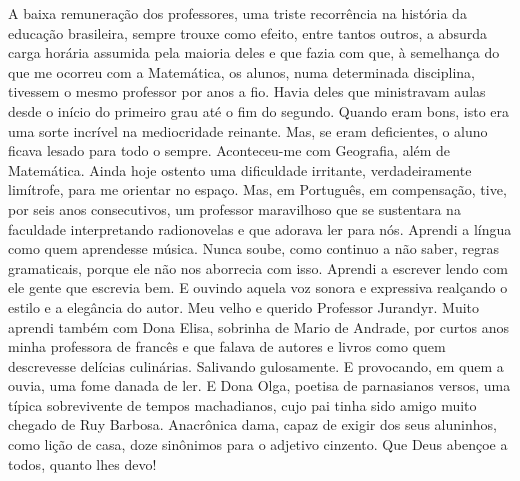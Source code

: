 A baixa remuneração dos professores, uma triste recorrência na história da educação brasileira, sempre trouxe como efeito, entre tantos outros, a absurda carga horária assumida pela maioria deles e que fazia com que, à semelhança do que me ocorreu com a Matemática, os alunos, numa determinada disciplina, tivessem o mesmo professor por anos a fio. 
Havia deles que ministravam aulas desde o início do primeiro grau até o fim do segundo. 
Quando eram bons, isto era uma sorte incrível na mediocridade reinante. 
Mas, se eram deficientes, o aluno ficava lesado para todo o sempre. 
Aconteceu-me com Geografia, além de Matemática. Ainda hoje ostento uma dificuldade irritante, verdadeiramente limítrofe, para me orientar no espaço. 
Mas, em Português, em compensação, tive, por seis anos consecutivos, um professor maravilhoso que se sustentara na faculdade interpretando radionovelas e que adorava ler para nós. 
Aprendi a língua como quem aprendesse música. 
Nunca soube, como continuo a não saber, regras gramaticais, porque ele não nos aborrecia com isso. 
Aprendi a escrever lendo com ele gente que escrevia bem.  
E ouvindo aquela voz sonora e expressiva realçando o estilo e a elegância do autor. 
Meu velho e querido Professor Jurandyr. Muito aprendi também com Dona Elisa, sobrinha de Mario de Andrade, por curtos anos minha professora de francês e que falava de autores e livros como quem descrevesse delícias culinárias. 
Salivando gulosamente. 
E provocando, em quem a ouvia, uma fome danada de ler. 
E Dona Olga, poetisa de parnasianos versos, uma típica sobrevivente de tempos machadianos, cujo pai tinha sido amigo muito chegado de Ruy Barbosa. 
Anacrônica dama, capaz de exigir dos seus aluninhos, como lição de casa, doze sinônimos para o adjetivo cinzento. 
Que Deus abençoe a todos, quanto lhes devo!
